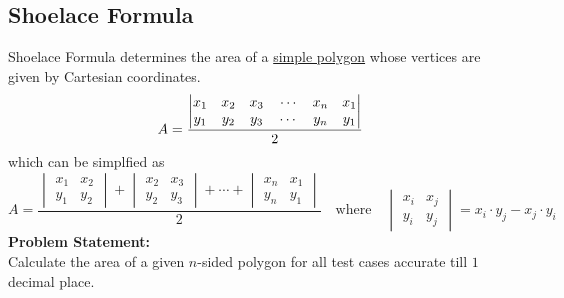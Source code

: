 \documentclass[../../Problems]{subfiles}
\begin{document}
\subsection{Shoelace Formula}
Shoelace Formula determines the area of a \href{https://en.wikipedia.org/wiki/Simple_polygon}{simple polygon} whose vertices are given by Cartesian coordinates.
\begin{equation}{\label{eq:shoelace}}
A = \frac{{\begin{vmatrix}x_{1}&x_{2}&x_{3}\quad\cdots &x_{n}&x_{1}\\y_{1}&y_{2}&y_{3}\quad \cdots &y_{n}&y_{1}\end{vmatrix}}}{2}
\end{equation}
which can be simplfied as
\begin{equation*}
A = \frac{{\begin{vmatrix}x_{1}&x_{2}\\y_{1}&y_{2}\end{vmatrix}}+{\begin{vmatrix}x_{2}&x_{3}\\y_{2}&y_{3}\end{vmatrix}}+\cdots +{\begin{vmatrix}x_{n}&x_{1}\\y_{n}&y_{1}\end{vmatrix}}}{2}\quad\text{where}\quad
\begin{vmatrix}x_{i}&x_{j}\\y_{i}&y_{j}\end{vmatrix} = x_i\cdot y_j - x_j\cdot y_i
\end{equation*}
\textbf{Problem Statement:}\\
Calculate the area of a given $n$-sided polygon for all test cases accurate till $1$ decimal place.
\end{document}

